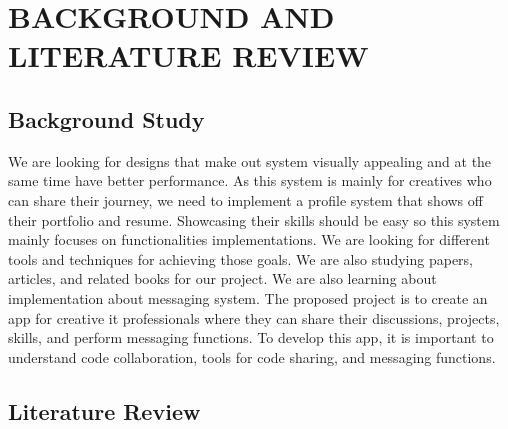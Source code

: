 \chapter{BACKGROUND AND LITERATURE REVIEW}





\section{Background Study}

We are looking for designs that make out system visually appealing and at the same time have better performance. As this system is mainly for creatives who can share their journey, we need to implement a profile system that shows off their portfolio and resume. Showcasing their skills should be easy so this system mainly focuses on functionalities implementations. We are looking for different tools and techniques for achieving those goals. We are also studying papers, articles, and related books for our project. We are also learning about implementation about messaging system.
The proposed project is to create an app for creative it professionals where they can share their discussions, projects, skills, and perform messaging functions. To develop this app, it is important to understand code collaboration, tools for code sharing, and messaging functions.

\section{Literature Review}
